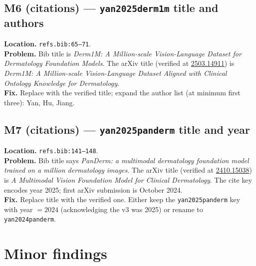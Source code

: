 \documentclass[11pt,a4paper]{article}
\begin{document}
\subsection*{M6 (citations) --- \texttt{yan2025derm1m} title and authors}
\textbf{Location.} \texttt{refs.bib:65--71}.\\
\textbf{Problem.} Bib title is \emph{Derm1M: A Million-scale
Vision-Language Dataset for Dermatology Foundation Models}. The arXiv
title (verified at \href{https://arxiv.org/abs/2503.14911}{2503.14911})
is \emph{Derm1M: A Million-scale Vision-Language Dataset Aligned with
Clinical Ontology Knowledge for Dermatology}.\\
\textbf{Fix.} Replace with the verified title; expand the author list
(at minimum first three): Yan, Hu, Jiang.

\subsection*{M7 (citations) --- \texttt{yan2025panderm} title and year}
\textbf{Location.} \texttt{refs.bib:141--148}.\\
\textbf{Problem.} Bib title says \emph{PanDerm: a multimodal dermatology
foundation model trained on a million dermatology images}. The arXiv
title (verified at
\href{https://arxiv.org/abs/2410.15038}{2410.15038}) is
\emph{A Multimodal Vision Foundation Model for Clinical Dermatology}.
The cite key encodes year 2025; first arXiv submission is October 2024.\\
\textbf{Fix.} Replace title with the verified one. Either keep the
\texttt{yan2025panderm} key with year $= 2024$ (acknowledging the v3
was 2025) or rename to \texttt{yan2024panderm}.

\section{Minor findings}
\end{document}
